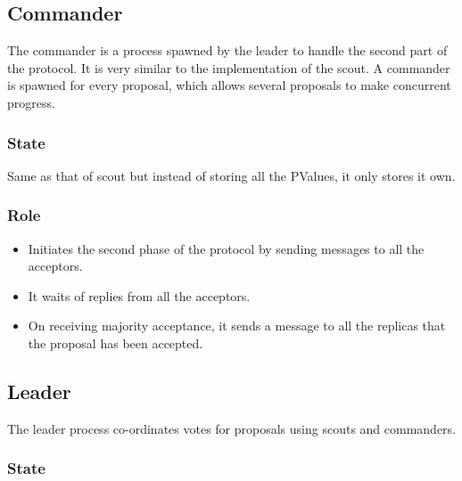 \subsection{Commander}

The commander is a process spawned by the leader to handle the second part of
the protocol. It is very similar to the implementation of the scout. A commander
is spawned for every proposal, which allows several proposals to make concurrent
progress.

\subsubsection{State}

Same as that of scout  but instead of storing all the
PValues, it only stores it own.

\subsubsection{Role}

\begin{itemize}
  \item Initiates the second phase of the protocol by sending 
    messages to all the acceptors.
  \item It waits of replies from all the acceptors.
  \item On receiving majority acceptance, it sends a message to all the replicas
    that the proposal has been accepted.
\end{itemize}

\subsection{Leader}

The leader process co-ordinates votes for proposals using scouts and commanders.

\subsubsection{State}

